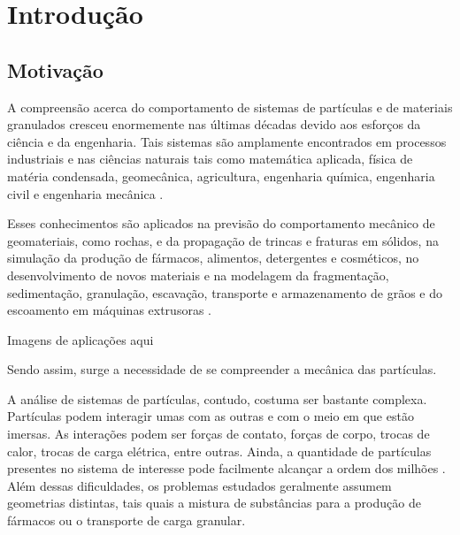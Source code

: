 \chapter[Introdução]{Introdução}

\section{Motivação} \label{sec:motivation}

A compreensão acerca do comportamento de sistemas de partículas e de materiais granulados cresceu enormemente nas últimas décadas devido aos esforços da ciência e da engenharia. Tais sistemas são amplamente encontrados em processos industriais e nas ciências naturais \cite{bib:computational_granular_dynamics} tais como matemática aplicada, física de matéria condensada, geomecânica, agricultura, engenharia química, engenharia civil e engenharia mecânica \cite{bib:rolling}.

Esses conhecimentos são aplicados na previsão do comportamento mecânico de geomateriais, como rochas, e da propagação de trincas e fraturas em sólidos, na simulação da produção de fármacos, alimentos, detergentes e cosméticos, no desenvolvimento de novos materiais e na modelagem da fragmentação, sedimentação, granulação, escavação, transporte e armazenamento de grãos e do escoamento em máquinas extrusoras \cite{bib:donze,bib:poschel,bib:applications}.

\alert{Imagens de aplicações aqui}


Sendo assim, surge a necessidade de se compreender a mecânica das partículas.

A análise de sistemas de partículas, contudo, costuma ser bastante complexa. Partículas podem interagir umas com as outras e com o meio em que estão imersas. As interações podem ser forças de contato, forças de corpo, trocas de calor, trocas de carga elétrica, entre outras. Ainda, a quantidade de partículas presentes no sistema de interesse pode facilmente alcançar a ordem dos milhões \cite{bib:computational_granular_dynamics}. Além dessas dificuldades, os problemas estudados geralmente assumem geometrias distintas, tais quais a mistura de substâncias para a produção de fármacos ou o transporte de carga granular.

